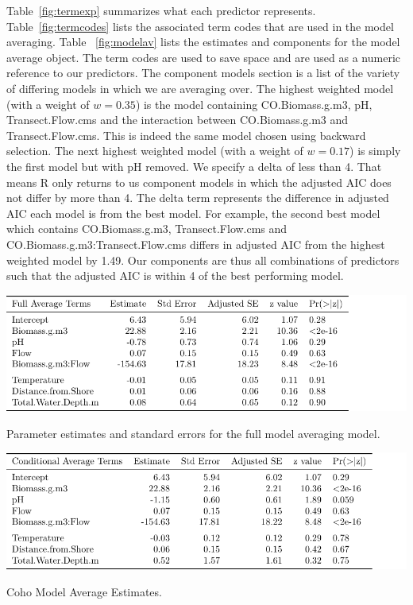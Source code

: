 Table~\ref{fig:termexp} summarizes what each predictor represents. Table~\ref{fig:termcodes} lists the associated term codes that are used in the model averaging. Table ~\ref{fig:modelav} lists the estimates and components for the model average object. The term codes are used to save space and are used as a numeric reference to our predictors. The component models section is a list of the variety of differing models in which we are averaging over. The highest weighted model (with a weight of $w=0.35$) is the model containing CO.Biomass.g.m3, pH, Transect.Flow.cms and the interaction between CO.Biomass.g.m3 and Transect.Flow.cms. This is indeed the same model chosen using backward selection. The next highest weighted model (with a weight of $w=0.17$) is simply the first model but with pH removed. We specify a delta of less than 4. That means R only returns to us component models in which the adjusted AIC does not differ by more than 4. The delta term represents the difference in adjusted AIC each model is from the best model. For example, the second best model which contains CO.Biomass.g.m3, Transect.Flow.cms and CO.Biomass.g.m3:Transect.Flow.cms differs in adjusted AIC from the highest weighted model by 1.49. Our components are thus all combinations of predictors such that the adjusted AIC is within 4 of the best performing model.


\vspace{5mm}



\begin{table}[H]
\includegraphics{Chapter5Images/fullAV.pdf}
\caption{Parameter estimates and standard errors for the full model averaging model.}
\label{fig:fullav}
\end{table}

\begin{table}[H]
\includegraphics{Chapter5Images/condAV.pdf}
\caption{Coho Model Average Estimates.}
\label{fig:condav}
\end{table}



